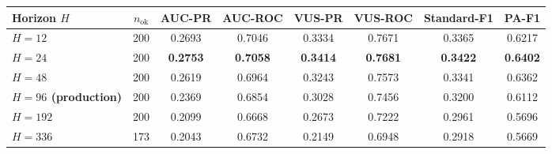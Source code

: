 \documentclass[border=2pt]{standalone}
\begin{document}
\renewcommand{\arraystretch}{1.1}
\setlength{\tabcolsep}{6pt}
\small

\begin{tabular}{l|c|cccccc}
\toprule
\textbf{Horizon $H$} & \textbf{$n_\textrm{ok}$} & \textbf{AUC-PR} & \textbf{AUC-ROC} & \textbf{VUS-PR} & \textbf{VUS-ROC} & \textbf{Standard-F1} & \textbf{PA-F1} \\
\midrule
\textbf{$H=12$}  & 200 & 0.2693 & 0.7046 & 0.3334 & 0.7671 & 0.3365 & 0.6217 \\
\textbf{$H=24$}  & 200 & \textbf{0.2753} & \textbf{0.7058} & \textbf{0.3414} & \textbf{0.7681} & \textbf{0.3422} & \textbf{0.6402} \\
\textbf{$H=48$}  & 200 & 0.2619 & 0.6964 & 0.3243 & 0.7573 & 0.3341 & 0.6362 \\
\textbf{$H=96$ (production)}  & 200 & 0.2369 & 0.6854 & 0.3028 & 0.7456 & 0.3200 & 0.6112 \\
\textbf{$H=192$}  & 200 & 0.2099 & 0.6668 & 0.2673 & 0.7222 & 0.2961 & 0.5696 \\
\textbf{$H=336$}  & 173 & 0.2043 & 0.6732 & 0.2149 & 0.6948 & 0.2918 & 0.5669 \\
\bottomrule
\end{tabular}
\end{document}
